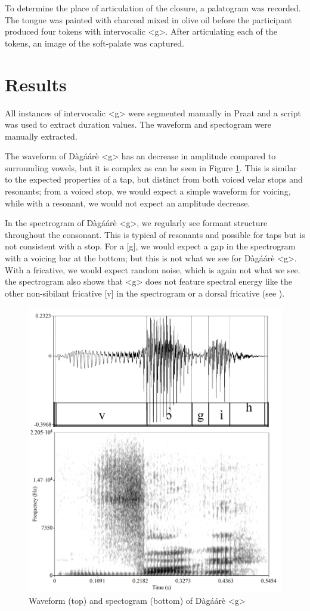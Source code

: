 \documentclass[output=paper, modfonts]{langscibook}
\begin{document}
To determine the place of articulation of the closure, a palatogram was recorded. The tongue was painted with charcoal mixed in olive oil before the participant produced four tokens with intervocalic <g>. After articulating each of the tokens, an image of the soft-palate was captured.

\section{Results}
All instances of intervocalic <g> were segmented manually in Praat \citep{boersma2002praat} and a script was used to extract duration values. The waveform and spectogram were manually extracted.

The waveform of Dàgáárè <g> has an decrease in amplitude compared to surrounding vowels, but it is complex as can be seen in Figure \ref{tab:1:spectogram}. This is similar to the expected properties of a tap, but distinct from both voiced velar stops and resonants; from a voiced stop, we would expect a simple waveform for voicing, while with a resonant, we would not expect an amplitude decrease.


In the spectrogram of Dàgáárè <g>, we regularly see formant structure throughout the consonant. This is typical of resonants and possible for taps but is not consistent with a stop. For a [g], we would expect a gap in the spectrogram with a voicing bar at the bottom; but this is not what we see for Dàgáárè <g>. With a fricative, we would expect random noise, which is again not what we see. the spectrogram also shows that <g> does not feature spectral energy like the other non-sibilant fricative [v] in the spectrogram or a dorsal fricative (see \citealt{jesus2005acoustic}).


\begin{figure}[H]
\includegraphics[width=0.75\linewidth]{wave_specto_vogi2.jpg}
  \caption{Waveform (top) and spectogram (bottom) of D\`ag\'a\'ar\`e <g>}
  \label{tab:1:spectogram}
\end{figure}
\end{document}
